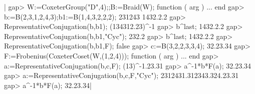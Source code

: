 |    gap> W:=CoxeterGroup("D",4);;B:=Braid(W);
    function ( arg ) ... end
    gap> b:=B(2,3,1,2,4,3);b1:=B(1,4,3,2,2,2);
    231243
    1432.2.2
    gap> RepresentativeConjugation(b,b1);
    (134312.23)^-1
    gap> b^last;
    1432.2.2
    gap> RepresentativeConjugation(b,b1,"Cyc");
    232.2
    gap> b^last;
    1432.2.2
    gap> RepresentativeConjugation(b,b1,F);
    false
    gap> c:=B(3,2,2,3,3,4);
    32.23.34
    gap> F:=Frobenius(CoxeterCoset(W,(1,2,4)));
    function ( arg ) ... end
    gap> a:=RepresentativeConjugation(b,c,F);
    (13)^-1.23.31
    gap> a^-1*b*F(a);
    32.23.34
    gap> a:=RepresentativeConjugation(b,c,F,"Cyc");
    2312431.312343.324.23.31
    gap> a^-1*b*F(a);
    32.23.34|

